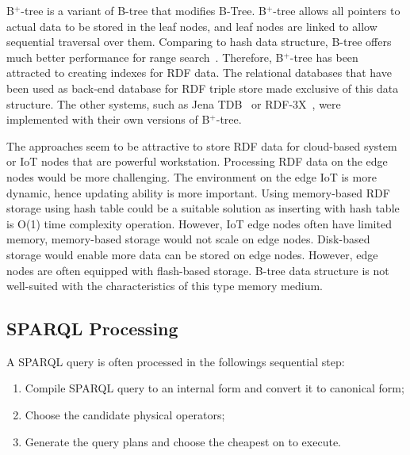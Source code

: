 {B$^{+}$-tree is a variant of B-tree that modifies B-Tree.
B$^{+}$-tree allows all pointers to actual data to be stored in the leaf nodes, and leaf nodes are linked to allow sequential traversal over them.
Comparing to hash data structure, B-tree offers much better performance for range search~\citep{Ullman:2001}.
Therefore, B$^{+}$-tree has been attracted to creating indexes for RDF data.
The relational databases that have been used as back-end database for RDF triple store made exclusive of this data structure. 
The other systems, such as Jena TDB~\citep{Owens:2008} or RDF-3X~\citep{Neumann:2010}, were implemented with their own versions of B$^{+}$-tree.

The approaches seem to be attractive to store RDF data for cloud-based system or IoT nodes that are powerful workstation.
Processing RDF data on the edge nodes would be more challenging.
The environment on the edge IoT is more dynamic, hence updating ability is more important.
Using memory-based RDF storage using hash table could be a suitable solution as inserting with hash table is O(1) time complexity operation.
However, IoT edge nodes often have limited memory, memory-based storage would not scale on edge nodes. 
Disk-based storage would enable more data can be stored on edge nodes.
However, edge nodes are often equipped with flash-based storage.
B-tree data structure is not well-suited with the characteristics of this type memory medium.


\subsection{SPARQL Processing}

A SPARQL query is often processed in the followings sequential step:
\begin{enumerate}[noitemsep,nolistsep,label=(\roman*)]
\item Compile SPARQL query to an internal form and convert it to canonical form;
\item Choose the candidate physical operators;
\item Generate the query plans and choose the cheapest on to execute. 
\end{enumerate}

}
